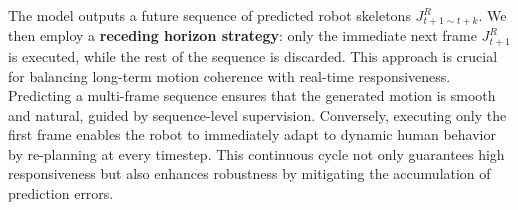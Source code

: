 The model outputs a future sequence of predicted robot skeletons $J^R_{t+1 \sim t+k}$. We then employ a \textbf{receding horizon strategy}: only the immediate next frame $J^R_{t+1}$ is executed, while the rest of the sequence is discarded. This approach is crucial for balancing long-term motion coherence with real-time responsiveness. Predicting a multi-frame sequence ensures that the generated motion is smooth and natural, guided by sequence-level supervision. Conversely, executing only the first frame enables the robot to immediately adapt to dynamic human behavior by re-planning at every timestep. This continuous cycle not only guarantees high responsiveness but also enhances robustness by mitigating the accumulation of prediction errors.










